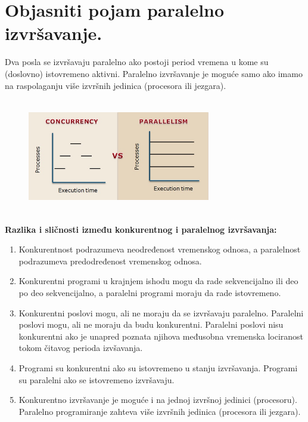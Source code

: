 \documentclass[a4paper]{article}
\begin{document}
\section{Objasniti pojam paralelno izvršavanje.}
  Dva posla se izvršavaju paralelno ako postoji period vremena u kome su (doslovno) 
  istovremeno aktivni. Paralelno izvršavanje je moguće samo ako imamo na raspolaganju
  više izvršnih jedinica (procesora ili jezgara). \\
  
  \begin{figure}[H]
    \begin{center}
        \includegraphics[width=80mm,height=50mm]{Slike/konkurencija_paralelizacija.jpg}
    \end{center}
  \end{figure}

  \noindent \textbf{Razlika i sličnosti između konkurentnog i paralelnog izvršavanja:}
  \begin{enumerate}
    \item Konkurentnost podrazumeva neodređenost vremenskog odnosa, a paralelnost podrazumeva
          predodređenost vremenskog odnosa.
    \item Konkurentni programi u krajnjem ishodu mogu da rade sekvencijalno ili deo po deo
          sekvencijalno, a paralelni programi moraju da rade istovremeno.
    \item Konkurentni poslovi mogu, ali ne moraju da se izvršavaju paralelno. Paralelni poslovi
          mogu, ali ne moraju da budu konkurentni. Paralelni poslovi nisu konkurentni ako je unapred
          poznata njihova međusobna vremenska lociranost tokom čitavog perioda izvšavanja.
    \item Programi su konkurentni ako su istovremeno u stanju izvršavanja. Programi su paralelni
          ako se istovremeno izvršavaju. 
    \item Konkurentno izvršavanje je moguće i na jednoj izvršnoj jedinici (procesoru). 
          Paralelno programiranje zahteva više izvršnih jedinica (procesora ili jezgara).
  \end{enumerate}
\end{document}
